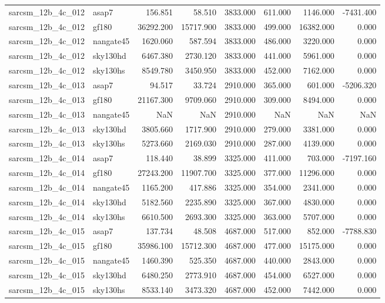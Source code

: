 \begin{tabular}{llrrrrrr}
sarcsm\_12b\_4c\_012 & asap7 & 156.851 & 58.510 & 3833.000 & 611.000 & 1146.000 & -7431.400 \\
sarcsm\_12b\_4c\_012 & gf180 & 36292.200 & 15717.900 & 3833.000 & 499.000 & 16382.000 & 0.000 \\
sarcsm\_12b\_4c\_012 & nangate45 & 1620.060 & 587.594 & 3833.000 & 486.000 & 3220.000 & 0.000 \\
sarcsm\_12b\_4c\_012 & sky130hd & 6467.380 & 2730.120 & 3833.000 & 441.000 & 5961.000 & 0.000 \\
sarcsm\_12b\_4c\_012 & sky130hs & 8549.780 & 3450.950 & 3833.000 & 452.000 & 7162.000 & 0.000 \\
sarcsm\_12b\_4c\_013 & asap7 & 94.517 & 33.724 & 2910.000 & 365.000 & 601.000 & -5206.320 \\
sarcsm\_12b\_4c\_013 & gf180 & 21167.300 & 9709.060 & 2910.000 & 309.000 & 8494.000 & 0.000 \\
sarcsm\_12b\_4c\_013 & nangate45 & NaN & NaN & 2910.000 & NaN & NaN & NaN \\
sarcsm\_12b\_4c\_013 & sky130hd & 3805.660 & 1717.900 & 2910.000 & 279.000 & 3381.000 & 0.000 \\
sarcsm\_12b\_4c\_013 & sky130hs & 5273.660 & 2169.030 & 2910.000 & 287.000 & 4139.000 & 0.000 \\
sarcsm\_12b\_4c\_014 & asap7 & 118.440 & 38.899 & 3325.000 & 411.000 & 703.000 & -7197.160 \\
sarcsm\_12b\_4c\_014 & gf180 & 27243.200 & 11907.700 & 3325.000 & 377.000 & 11296.000 & 0.000 \\
sarcsm\_12b\_4c\_014 & nangate45 & 1165.200 & 417.886 & 3325.000 & 354.000 & 2341.000 & 0.000 \\
sarcsm\_12b\_4c\_014 & sky130hd & 5182.560 & 2235.890 & 3325.000 & 367.000 & 4830.000 & 0.000 \\
sarcsm\_12b\_4c\_014 & sky130hs & 6610.500 & 2693.300 & 3325.000 & 363.000 & 5707.000 & 0.000 \\
sarcsm\_12b\_4c\_015 & asap7 & 137.734 & 48.508 & 4687.000 & 517.000 & 852.000 & -7788.830 \\
sarcsm\_12b\_4c\_015 & gf180 & 35986.100 & 15712.300 & 4687.000 & 477.000 & 15175.000 & 0.000 \\
sarcsm\_12b\_4c\_015 & nangate45 & 1460.390 & 525.350 & 4687.000 & 440.000 & 2843.000 & 0.000 \\
sarcsm\_12b\_4c\_015 & sky130hd & 6480.250 & 2773.910 & 4687.000 & 454.000 & 6527.000 & 0.000 \\
sarcsm\_12b\_4c\_015 & sky130hs & 8533.140 & 3473.320 & 4687.000 & 452.000 & 7442.000 & 0.000 \\

\end{tabular}
